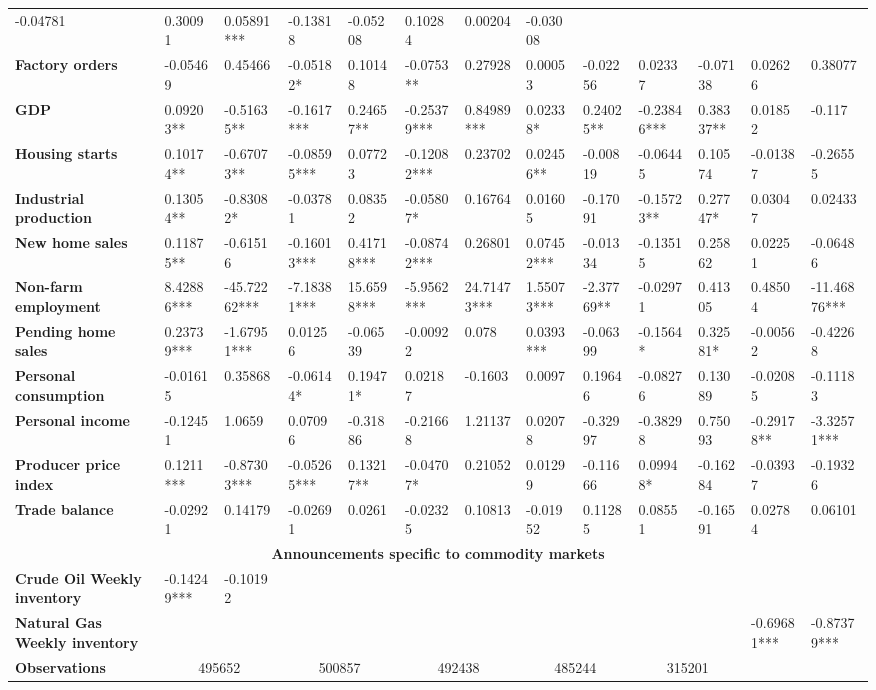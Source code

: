 \begin{sidewaystable}
{\begin{tabular}{@{}lllllllllllll@{}}
-0.04781 & 0.30091 & 0.05891*** & -0.13818 & -0.05208 & 0.10284 & 0.00204 & -0.03008 \\ \textbf{Factory orders}& -0.05469 & 0.45466 & -0.05182* & 0.10148 & -0.0753** & 0.27928 & 0.00053 & -0.02256 & 0.02337 & -0.07138 & 0.02626 & 0.38077 \\ \textbf{GDP}& 0.09203** & -0.51635** & -0.1617*** & 0.24657** & -0.25379*** & 0.84989*** & 0.02338* & 0.24025** & -0.23846*** & 0.38337** & 0.01852 & -0.117 \\ \textbf{Housing starts}& 0.10174** & -0.67073** & -0.08595*** & 0.07723 & -0.12082*** & 0.23702 & 0.02456** & -0.00819 & -0.06445 & 0.10574 & -0.01387 & -0.26555 \\ \textbf{Industrial production}& 0.13054** & -0.83082* & -0.03781 & 0.08352 & -0.05807* & 0.16764 & 0.01605 & -0.17091 & -0.15723** & 0.27747* & 0.03047 & 0.02433 \\ \textbf{New home sales}& 0.11875** & -0.61516 & -0.16013*** & 0.41718*** & -0.08742*** & 0.26801 & 0.07452*** & -0.01334 & -0.13515 & 0.25862 & 0.02251 & -0.06486 \\ \textbf{Non-farm employment}& 8.42886*** & -45.72262*** & -7.18381*** & 15.6598*** & -5.9562*** & 24.71473*** & 1.55073*** & -2.37769** & -0.02971 & 0.41305 & 0.48504 & -11.46876*** \\ \textbf{Pending home sales}& 0.23739*** & -1.67951*** & 0.01256 & -0.06539 & -0.00922 & 0.078 & 0.0393*** & -0.06399 & -0.1564* & 0.32581* & -0.00562 & -0.42268 \\ \textbf{Personal consumption}& -0.01615 & 0.35868 & -0.06144* & 0.19471* & 0.02187 & -0.1603 & 0.0097 & 0.19646 & -0.08276 & 0.13089 & -0.02085 & -0.11183 \\ \textbf{Personal income}& -0.12451 & 1.0659 & 0.07096 & -0.31886 & -0.21668 & 1.21137 & 0.02078 & -0.32997 & -0.38298 & 0.75093 & -0.29178** & -3.32571*** \\ \textbf{Producer price index}& 0.1211*** & -0.87303*** & -0.05265*** & 0.13217** & -0.04707* & 0.21052 & 0.01299 & -0.11666 & 0.09948* & -0.16284 & -0.03937 & -0.19326 \\ \textbf{Trade balance}& -0.02921 & 0.14179 & -0.02691 & 0.0261 & -0.02325 & 0.10813 & -0.01952 & 0.11285 & 0.08551 & -0.16591 & 0.02784 & 0.06101 \\  \midrule \multicolumn{13}{c}{\textbf{Announcements specific to commodity markets}} \\ \midrule \textbf{Crude Oil Weekly inventory}& -0.14249*** & -0.10192 &  &  &  &  &  &  &  &  &  &  \\ \textbf{Natural Gas Weekly inventory}&  &  &  &  &  &  &  &  &  &  & -0.69681*** & -0.87379*** \\  \midrule \textbf{Observations}             &\multicolumn{2}{c}{ 495652 }                                                 & \multicolumn{2}{c}{ 500857 }                                                 & \multicolumn{2}{c}{ 492438 }                                                 & \multicolumn{2}{c}{ 485244 }                                                 & \multicolumn{2}{c}{ 315201 }                                                   & 
\end{tabular}}
\end{sidewaystable}
